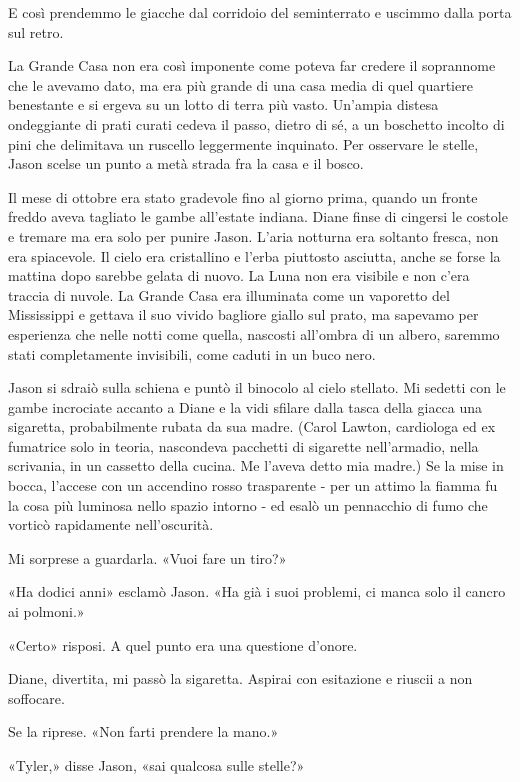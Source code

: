 E così prendemmo le giacche dal corridoio del seminterrato e uscimmo
dalla porta sul retro.

La Grande Casa non era così imponente come poteva far credere il
soprannome che le avevamo dato, ma era più grande di una casa media di
quel quartiere benestante e si ergeva su un lotto di terra più vasto.
Un'ampia distesa ondeggiante di prati curati cedeva il passo, dietro di
sé, a un boschetto incolto di pini che delimitava un ruscello
leggermente inquinato. Per osservare le stelle, Jason scelse un punto a
metà strada fra la casa e il bosco.

Il mese di ottobre era stato gradevole fino al giorno prima, quando un
fronte freddo aveva tagliato le gambe all'estate indiana. Diane finse di
cingersi le costole e tremare ma era solo per punire Jason. L'aria
notturna era soltanto fresca, non era spiacevole. Il cielo era
cristallino e l'erba piuttosto asciutta, anche se forse la mattina dopo
sarebbe gelata di nuovo. La Luna non era visibile e non c'era traccia di
nuvole. La Grande Casa era illuminata come un vaporetto del Mississippi
e gettava il suo vivido bagliore giallo sul prato, ma sapevamo per
esperienza che nelle notti come quella, nascosti all'ombra di un albero,
saremmo stati completamente invisibili, come caduti in un buco nero.

Jason si sdraiò sulla schiena e puntò il binocolo al cielo stellato. Mi
sedetti con le gambe incrociate accanto a Diane e la vidi sfilare dalla
tasca della giacca una sigaretta, probabilmente rubata da sua madre.
(Carol Lawton, cardiologa ed ex fumatrice solo in teoria, nascondeva
pacchetti di sigarette nell'armadio, nella scrivania, in un cassetto
della cucina. Me l'aveva detto mia madre.) Se la mise in bocca, l'accese
con un accendino rosso trasparente - per un attimo la fiamma fu la cosa
più luminosa nello spazio intorno - ed esalò un pennacchio di fumo che
vorticò rapidamente nell'oscurità.

Mi sorprese a guardarla. «Vuoi fare un tiro?»

«Ha dodici anni» esclamò Jason. «Ha già i suoi problemi, ci manca solo
il cancro ai polmoni.»

«Certo» risposi. A quel punto era una questione d'onore.

Diane, divertita, mi passò la sigaretta. Aspirai con esitazione e
riuscii a non soffocare.

Se la riprese. «Non farti prendere la mano.»

«Tyler,» disse Jason, «sai qualcosa sulle stelle?»

